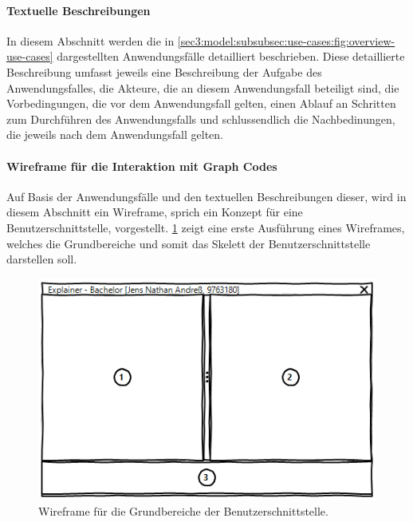 \paragraph{Textuelle Beschreibungen}
\label{sec3:model:par:textual-desc-use-cases}
In diesem Abschnitt werden die in \cref{sec3:model:subsubsec:use-cases:fig:overview-use-cases} dargestellten Anwendungsfälle detailliert beschrieben.
Diese detaillierte Beschreibung umfasst jeweils eine Beschreibung der Aufgabe des Anwendungsfalles, die Akteure, die an diesem Anwendungsfall beteiligt sind, die Vorbedingungen, die vor dem Anwendungsfall gelten, einen Ablauf an Schritten zum Durchführen des Anwendungsfalls und schlussendlich die Nachbedinungen, die jeweils nach dem Anwendungsfall gelten.



\paragraph{Wireframe für die Interaktion mit Graph Codes}
\label{sec3:model:par:wireframe}
Auf Basis der Anwendungsfälle und den textuellen Beschreibungen dieser, wird in diesem Abschnitt ein Wireframe, sprich ein Konzept für eine Benutzerschnittstelle, vorgestellt.
\cref{sec3:model:par:wireframe:fig:stage-1} zeigt eine erste Ausführung eines Wireframes, welches die Grundbereiche und somit das Skelett der Benutzerschnittstelle darstellen soll.

\begin{figure}[htb]
    \centering
    \includegraphics{chapter/chapter_3/wireframe-stage-1.png}
    \caption{Wireframe für die Grundbereiche der Benutzerschnittstelle.}
    \label{sec3:model:par:wireframe:fig:stage-1}
\end{figure}

